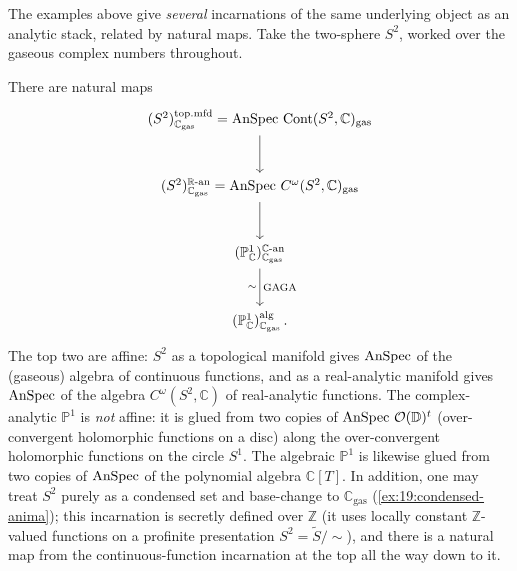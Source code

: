 The examples above give \emph{several} incarnations of the same underlying object
as an analytic stack, related by natural maps. Take the two-sphere $S^2$, worked
over the gaseous complex numbers throughout.

\begin{remark}
\label{rmk:19:incarnations}
There are natural maps
\begin{equation}
\label{eq:19:incarnations}
\begin{tikzcd}[row sep=large, column sep=small]
(S^2)^{\mathrm{top.mfd}}_{\mathbb C_{\mathrm{gas}}}=\AnSpec\,\Cont(S^2,\mathbb C)_{\mathrm{gas}}
\arrow[d] \\
(S^2)^{\mathbb R\text{-}\mathrm{an}}_{\mathbb C_{\mathrm{gas}}}=\AnSpec\,C^{\omega}(S^2,\mathbb C)_{\mathrm{gas}}
\arrow[d] \\
(\mathbb P^1_{\mathbb C})^{\mathbb C\text{-}\mathrm{an}}_{\mathbb C_{\mathrm{gas}}}
\arrow[d, "\sim"', "\mathrm{GAGA}"] \\
(\mathbb P^1_{\mathbb C})^{\mathrm{alg}}_{\mathbb C_{\mathrm{gas}}}\, .
\end{tikzcd}
\end{equation}
The top two are affine: $S^2$ as a topological manifold gives
$\operatorname{AnSpec}$ of the (gaseous) algebra of continuous functions, and as a
real-analytic manifold gives $\operatorname{AnSpec}$ of the algebra $C^\omega(S^2,\mathbb C)$
of real-analytic functions. The complex-analytic $\mathbb P^1$ is \emph{not}
affine: it is glued from two copies of $\operatorname{AnSpec}\,\mathcal O(\mathbb D)^t$
(over-convergent holomorphic functions on a disc) along the over-convergent
holomorphic functions on the circle $S^1$. The algebraic $\mathbb P^1$ is
likewise glued from two copies of $\operatorname{AnSpec}$ of the polynomial algebra
$\mathbb C[T]$. In addition, one may treat $S^2$ purely as a condensed set and
base-change to $\mathbb C_{\mathrm{gas}}$ (\cref{ex:19:condensed-anima}); this
incarnation is secretly defined over $\mathbb Z$ (it uses locally constant
$\mathbb Z$-valued functions on a profinite presentation
$S^2=\widetilde S/\!\sim$), and there is a natural map from the continuous-function
incarnation at the top all the way down to it.
\end{remark}

